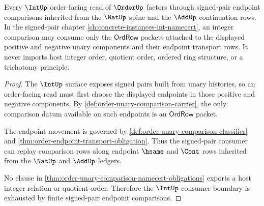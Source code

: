 \begin{theorem}
\label{thm:order-int-consumer-boundary}
Every $\IntUp$ order-facing read of $\OrderUp$ factors through signed-pair endpoint comparisons inherited from the $\NatUp$ spine and the $\AddUp$ continuation rows. In the signed-pair chapter \autoref{ch:concrete-instances-int-namecert}, an integer comparison may consume only the $\mathsf{OrdRow}$ packets attached to the displayed positive and negative unary components and their endpoint transport rows. It never imports host integer order, quotient order, ordered ring structure, or a trichotomy principle.
\end{theorem}
\begin{proof}
The $\IntUp$ surface exposes signed pairs built from unary histories, so an order-facing read must first choose the displayed endpoints in those positive and negative components. By \autoref{def:order-unary-comparison-carrier}, the only comparison datum available on such endpoints is an $\mathsf{OrdRow}$ packet.

The endpoint movement is governed by \autoref{def:order-unary-comparison-classifier} and \autoref{thm:order-endpoint-transport-obligation}. Thus the signed-pair consumer can replay comparison rows along endpoint $\hsame$ and $\Cont$ rows inherited from the $\NatUp$ and $\AddUp$ ledgers.

No clause in \autoref{thm:order-unary-comparison-namecert-obligations} exports a host integer relation or quotient order. Therefore the $\IntUp$ consumer boundary is exhausted by finite signed-pair endpoint comparisons.
\end{proof}

